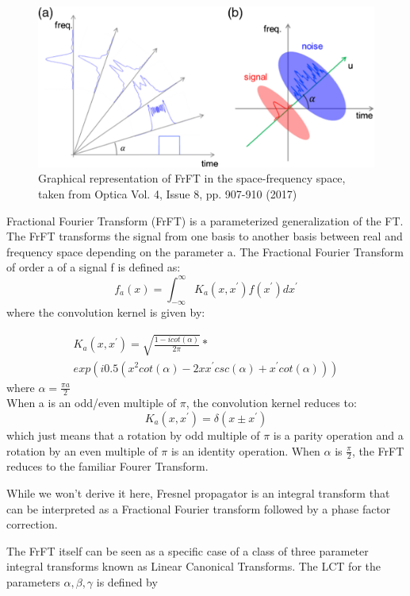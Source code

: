 \documentclass{iucr}              %
\begin{document}
\begin{figure}
\label{fig: FrFT graphic}
\caption{Graphical representation of FrFT in the space-frequency space, taken from Optica Vol. 4, Issue 8, pp. 907-910 (2017) }
\includegraphics[width=1\textwidth]{FrFT_optica.jpg}
\end{figure}
Fractional Fourier Transform (FrFT) is a parameterized generalization of the FT. The FrFT transforms the signal from one basis to another basis between real and frequency space depending on the parameter a. The Fractional Fourier Transform of order a of a signal f is defined as:
\begin{equation}
f_{a}(x) = \int_{-\infty}^{\infty}K_{a}(x,x^{'})f(x^{'})dx^{'}
\end{equation}
where the convolution kernel is given by:

\begin{multline*}
	K_{a}(x,x^{'}) = \sqrt{\frac{1-icot(\alpha)}{2\pi}}*\\exp(i0.5(x^{2}cot(\alpha)-2xx^{'}csc(\alpha)+x^{'}cot(\alpha)))
\end{multline*}
where $\alpha = \frac{\pi a}{2}$\\ 
When a is an odd/even multiple of $\pi$, the convolution kernel reduces to:
\begin{equation}
	K_{a}(x,x^{'}) = \delta(x\pm x^{'})
\end{equation}
which just means that a rotation by odd multiple of $\pi$ is a parity operation and a rotation by an even multiple of $\pi$ is an identity operation. When $\alpha$ is $\frac{\pi}{2}$, the FrFT reduces to the familiar Fourer Transform. 

While we won't derive it here, Fresnel propagator is an integral transform that can be interpreted as a Fractional Fourier transform followed by a phase factor correction\cite{Hanna2011}. 

The FrFT itself can be seen as a specific case of a class of three parameter integral transforms known as Linear Canonical Transforms\cite{Hennelly05}. The LCT for the parameters $\alpha, \beta, \gamma$ is defined by 
\end{document}
